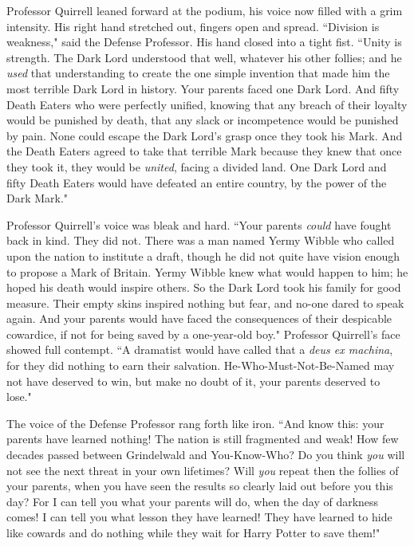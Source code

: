 Professor Quirrell leaned forward at the podium, his voice now filled with a grim intensity. His right hand stretched out, fingers open and spread. ``Division is weakness," said the Defense Professor. His hand closed into a tight fist. ``Unity is strength. The Dark Lord understood that well, whatever his other follies; and he \emph{used} that understanding to create the one simple invention that made him the most terrible Dark Lord in history. Your parents faced one Dark Lord. And fifty Death Eaters who were perfectly unified, knowing that any breach of their loyalty would be punished by death, that any slack or incompetence would be punished by pain. None could escape the Dark Lord's grasp once they took his Mark. And the Death Eaters agreed to take that terrible Mark because they knew that once they took it, they would be \emph{united}, facing a divided land. One Dark Lord and fifty Death Eaters would have defeated an entire country, by the power of the Dark Mark."

Professor Quirrell's voice was bleak and hard. ``Your parents \emph{could} have fought back in kind. They did not. There was a man named Yermy Wibble who called upon the nation to institute a draft, though he did not quite have vision enough to propose a Mark of Britain. Yermy Wibble knew what would happen to him; he hoped his death would inspire others. So the Dark Lord took his family for good measure. Their empty skins inspired nothing but fear, and no-one dared to speak again. And your parents would have faced the consequences of their despicable cowardice, if not for being saved by a one-year-old boy." Professor Quirrell's face showed full contempt. ``A dramatist would have called that a \emph{deus ex machina}, for they did nothing to earn their salvation. He-Who-Must-Not-Be-Named may not have deserved to win, but make no doubt of it, your parents deserved to lose."

The voice of the Defense Professor rang forth like iron. ``And know this: your parents have learned nothing! The nation is still fragmented and weak! How few decades passed between Grindelwald and You-Know-Who? Do you think \emph{you} will not see the next threat in your own lifetimes? Will \emph{you} repeat then the follies of your parents, when you have seen the results so clearly laid out before you this day? For I can tell you what your parents will do, when the day of darkness comes! I can tell you what lesson they have learned! They have learned to hide like cowards and do nothing while they wait for Harry Potter to save them!"

